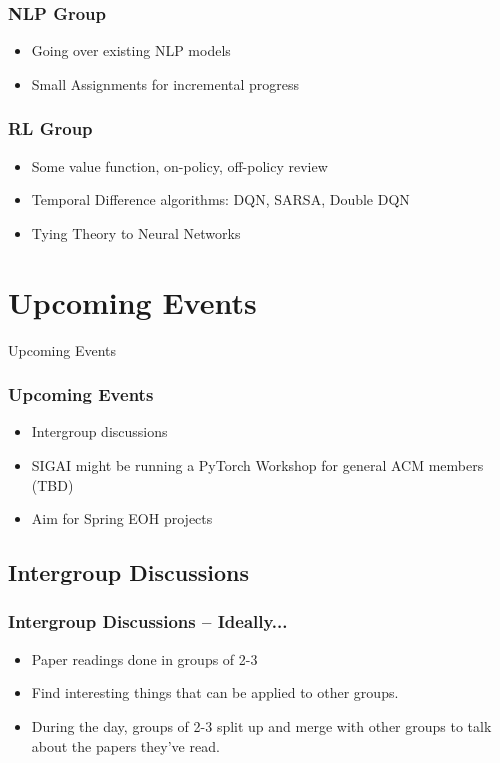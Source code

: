 \documentclass{beamer}
\begin{document}
\begin{frame}
  \frametitle{NLP Group}
  \begin{itemize}
  \item Going over existing NLP models
  \item Small Assignments for incremental progress
  \end{itemize}
\end{frame}

\begin{frame}
  \frametitle{RL Group}
  \begin{itemize}
  \item Some value function, on-policy, off-policy review
  \item Temporal Difference algorithms: DQN, SARSA, Double DQN
  \item Tying Theory to Neural Networks
  \end{itemize}
\end{frame}

\section{Upcoming Events}
\begin{frame}
  \huge{\centerline{Upcoming Events}}
\end{frame}
\begin{frame}
  \frametitle{Upcoming Events}
  \begin{itemize}
  \item Intergroup discussions
  \item \textcolor{mygray}{SIGAI might be running a PyTorch Workshop for general ACM members (TBD)}
  \item \textcolor{mygray}{Aim for Spring EOH projects}
  \end{itemize}
\end{frame}

\subsection{Intergroup Discussions}
\begin{frame}
  \frametitle{Intergroup Discussions -- Ideally...}
  \begin{itemize}
  \item Paper readings done in groups of 2-3
  \item Find interesting things that can be applied to other groups.
  \item During the day, groups of 2-3 split up and merge with other groups to talk about the papers they've read.
  \end{itemize}
\end{frame}
\end{document}
